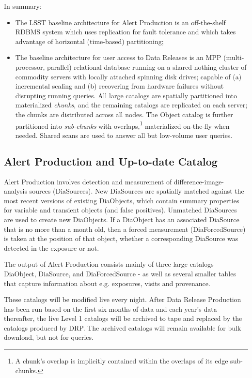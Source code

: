 \documentclass[DM,lsstdraft,toc]{lsstdoc}
\begin{document}
In summary:

\begin{itemize}
\item
  The LSST baseline architecture for Alert Production is an off-the-shelf
  RDBMS system which uses replication for fault tolerance and which takes
  advantage of horizontal (time-based) partitioning;
\item
  The baseline architecture for user access to Data Releases is an MPP
  (multi-processor, parallel) relational database running on a
  shared-nothing cluster of commodity servers with locally attached
  spinning disk drives; capable of (a) incremental scaling and (b)
  recovering from hardware failures without disrupting running queries.
  All large catalogs are spatially partitioned into materialized
  \emph{chunks}, and the remaining catalogs are replicated on each server;
  the chunks are distributed across all nodes. The Object catalog is
  further partitioned into \emph{sub-chunks} with overlaps,\footnote{A
  chunk's overlap is implicitly contained within the overlaps of its
  edge sub-chunks.} materialized on-the-fly when needed. Shared scans
  are used to answer all but low-volume user queries.
\end {itemize}

\subsection{Alert Production and Up-to-date Catalog}\label{alert-production-and-up-to-date-catalog}

Alert Production involves detection and measurement of difference-image-
analysis sources (DiaSources). New DiaSources are spatially matched against
the most recent versions of existing DiaObjects, which contain summary
properties for variable and transient objects (and false positives). Unmatched
DiaSources are used to create new DiaObjects. If a DiaObject has an associated
DiaSource that is no more than a month old, then a forced measurement
(DiaForcedSource) is taken at the position of that object, whether a
corresponding DiaSource was detected in the exposure or not.

The output of Alert Production consists mainly of three large catalogs --
DiaObject, DiaSource, and DiaForcedSource - as well as several smaller tables
that capture information about e.g. exposures, visits and provenance.

These catalogs will be modified live every night. After Data Release
Production has been run based on the first six months of data and each year's
data thereafter, the live Level 1 catalogs will be archived to tape and
replaced by the catalogs produced by DRP. The archived catalogs will remain
available for bulk download, but not for queries.
\end{document}
